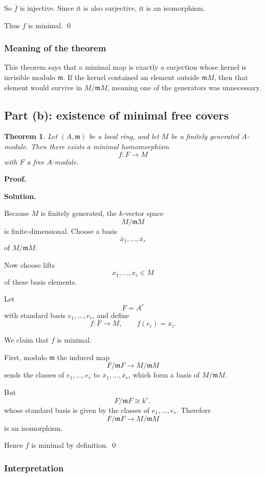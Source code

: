 \documentclass[12pt,a4paper]{article}
\theoremstyle{notespace}
\newtheorem{theorem}[definition]{Theorem}
\newcommand{\m}{\mathfrak m}
\begin{document}
So \(\overline f\) is injective. Since it is also surjective, it is an isomorphism.

Thus \(f\) is minimal. \qed

\subsubsection{Meaning of the theorem}

This theorem says that a minimal map is exactly a surjection whose kernel is invisible modulo \(\m\). If the kernel contained an element outside \(\m M\), then that element would survive in \(M/\m M\), meaning one of the generators was unnecessary.

\subsection{Part (b): existence of minimal free covers}

\begin{theorem}
	Let \((A,\m)\) be a local ring, and let \(M\) be a finitely generated \(A\)-module. Then there exists a minimal homomorphism
	\[
	f:F\to M
	\]
	with \(F\) a free \(A\)-module.
\end{theorem}

\textbf{Proof.}

\textbf{Solution.}

Because \(M\) is finitely generated, the \(k\)-vector space
\[
M/\m M
\]
is finite-dimensional. Choose a basis
\[
\overline x_1,\dots,\overline x_r
\]
of \(M/\m M\).

Now choose lifts
\[
x_1,\dots,x_r\in M
\]
of these basis elements.

Let
\[
F=A^r
\]
with standard basis \(e_1,\dots,e_r\), and define
\[
f:F\to M,\qquad f(e_i)=x_i.
\]

We claim that \(f\) is minimal.

First, modulo \(\m\) the induced map
\[
F/\m F \to M/\m M
\]
sends the classes of \(e_1,\dots,e_r\) to \(\overline x_1,\dots,\overline x_r\), which form a basis of \(M/\m M\).

But
\[
F/\m F \cong k^r,
\]
whose standard basis is given by the classes of \(e_1,\dots,e_r\). Therefore
\[
F/\m F \to M/\m M
\]
is an isomorphism.

Hence \(f\) is minimal by definition. \qed

\subsubsection{Interpretation}
\end{document}
